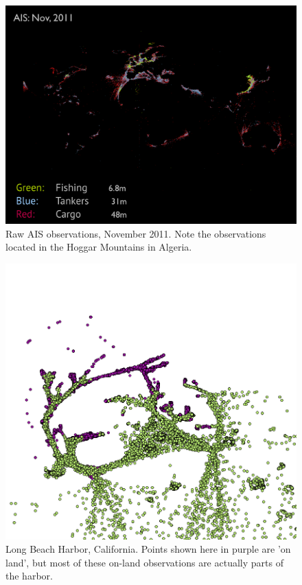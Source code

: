 \begin{figure}[htbp]
  \centering
  \includegraphics[width=160mm]{figures/ais-nov-2011.pdf}
  \caption[AIS observations, November 2011]{Raw AIS observations, November 2011. Note the observations located in the Hoggar Mountains in Algeria.}
  \label{fig:ais-obs-nov-2011}
\end{figure}

\begin{figure}[htbp]
  \centering
  \includegraphics[width=140mm]{figures/example-long-beach-harbor-validation.png}
  \caption[Long beach harbor, validation example]{Long Beach Harbor, California. Points shown here in purple are 'on land', but most of these on-land observations are actually parts of the harbor.} %
  \label{fig:longbeach-validation}
\end{figure}


